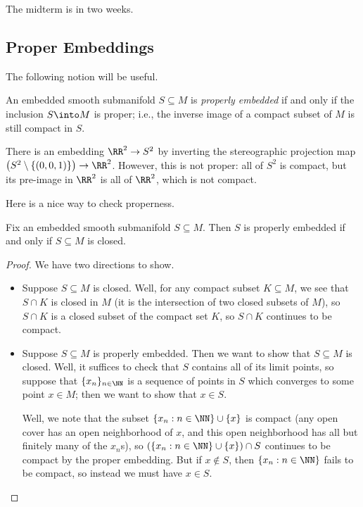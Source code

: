 \documentclass[../notes.tex]{subfiles}
\begin{document}
The midterm is in two weeks.

\subsection{Proper Embeddings}
The following notion will be useful.
\begin{definition}
	An embedded smooth submanifold $S\subseteq M$ is \textit{properly embedded} if and only if the inclusion $S\into M$ is proper; i.e., the inverse image of a compact subset of $M$ is still compact in $S$.
\end{definition}
\begin{nex}
	There is an embedding $\RR^2\to S^2$ by inverting the stereographic projection map $\left(S^2\setminus\{(0,0,1)\}\right)\to\RR^2$. However, this is not proper: all of $S^2$ is compact, but its pre-image in $\RR^2$ is all of $\RR^2$, which is not compact.
\end{nex}
Here is a nice way to check properness.
\begin{proposition}
	Fix an embedded smooth submanifold $S\subseteq M$. Then $S$ is properly embedded if and only if $S\subseteq M$ is closed.
\end{proposition}
\begin{proof}
	We have two directions to show.
	\begin{itemize}
		\item Suppose $S\subseteq M$ is closed. Well, for any compact subset $K\subseteq M$, we see that $S\cap K$ is closed in $M$ (it is the intersection of two closed subsets of $M$), so $S\cap K$ is a closed subset of the compact set $K$, so $S\cap K$ continues to be compact.

		\item Suppose $S\subseteq M$ is properly embedded. Then we want to show that $S\subseteq M$ is closed. Well, it suffices to check that $S$ contains all of its limit points, so suppose that $\{x_n\}_{n\in\NN}$ is a sequence of points in $S$ which converges to some point $x\in M$; then we want to show that $x\in S$.

		Well, we note that the subset $\{x_n:n\in\NN\}\cup\{x\}$ is compact (any open cover has an open neighborhood of $x$, and this open neighborhood has all but finitely many of the $x_n$s), so $(\{x_n:n\in\NN\}\cup\{x\})\cap S$ continues to be compact by the proper embedding. But if $x\notin S$, then $\{x_n:n\in\NN\}$ fails to be compact, so instead we must have $x\in S$.
		\qedhere
	\end{itemize}
\end{proof}
\end{document}
